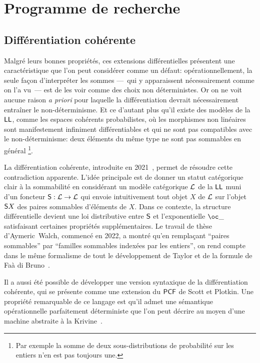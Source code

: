 \documentclass[a4]{article}
\begin{document}

\section*{Programme de recherche}

\subsection*{Différentiation cohérente}
Malgré leurs bonnes propriétés, ces extensions différentielles
présentent une caractéristique que l'on peut considérer comme un
défaut: opérationnellement, la seule façon d'interpréter les sommes
---~qui y apparaissent nécessairement comme on l'a vu~--- est de les
voir comme des choix non déterministes.
%
Or on ne voit aucune raison \emph{a priori} pour laquelle la
différentiation devrait nécessairement entraîner le non-déterminisme.
%
Et ce d'autant plus qu'il existe des modèles de la $\hbox{\textsf{LL}}$, comme les
espaces cohérents probabilistes, où les morphismes non linéaires sont
manifestement infiniment différentiables et qui ne sont pas
compatibles avec le non-déterminisme: deux éléments du même type ne
sont pas sommables en général%
\footnote{Par exemple la somme de deux sous-distributions de probabilité sur
  les entiers n'en est pas toujours une.}.

La différentiation cohérente, introduite en 2021~\cite{Ehrhard23a},
permet de résoudre cette contradiction apparente.
%
L'idée principale est de donner un statut catégorique clair à la
sommabilité en considérant un modèle catégorique $\mathcal{L}$ de la $\hbox{\textsf{LL}}$
muni d'un foncteur ${\mathsf S}:\mathcal{L}\to\mathcal{L}$ qui envoie intuitivement tout
objet $X$ de $\mathcal{L}$ sur l'objet ${\mathsf S} X$ des paires sommables
d'éléments de $X$.
%
Dans ce contexte, la structure différentielle devient une loi
distributive entre ${\mathsf S}$ et l'exponentielle $\Oc\_$ satisfaisant
certaines propriétés supplémentaires.
%
Le travail de thèse d'Aymeric~Walch, commencé en 2022, a montré qu'en
remplaçant ``paires sommables'' par ``familles sommables indexées par
les entiers'', on rend compte dans le même formalisme de tout le
développement de Taylor et de la formule de Faà di
Bruno~\cite{EhrhardWalch23b}.

Il a aussi été possible de développer une version syntaxique de la
diffé\-ren\-tia\-tion cohérente, qui se présente comme une extension du
$\mathsf{PCF}$ de Scott et Plotkin.
%
Une propriété remarquable de ce langage est qu'il admet une sémantique
opérationnelle parfaitement déterministe que l'on peut décrire au
moyen d'une machine abstraite à la Krivine~\cite{Ehrhard23b}.
%
\end{document}
